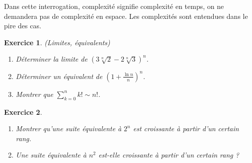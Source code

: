 \documentclass[11pt,a4paper]{article}
\newtheorem{ex}{Exercice}
\begin{document}
\bigskip



Dans cette interrogation, \og complexité\fg{} signifie \og complexité en temps\fg, on ne demandera pas de complexité en espace. Les complexités sont entendues dans le pire des cas.


\begin{ex}(Limites, équivalents)\label{limites}
\begin{enumerate}
\item Déterminer la limite de $(3\sqrt[n]{2} - 2\sqrt[n]{3})^n$.
\item Déterminer un équivalent de $\left(1+\frac{\ln n}{n}\right)^n$.
\item Montrer que $\sum_{k=0}^n k! \sim n!$.
\end{enumerate}
\end{ex}

\begin{ex}\label{equiv_suite}
\begin{enumerate}
\item Montrer qu'une suite équivalente à $2^n$ est croissante à partir d'un certain rang.
\item Une suite équivalente à $n^2$ est-elle croissante à partir d'un certain rang ?
\end{enumerate}
\end{ex}
\end{document}
